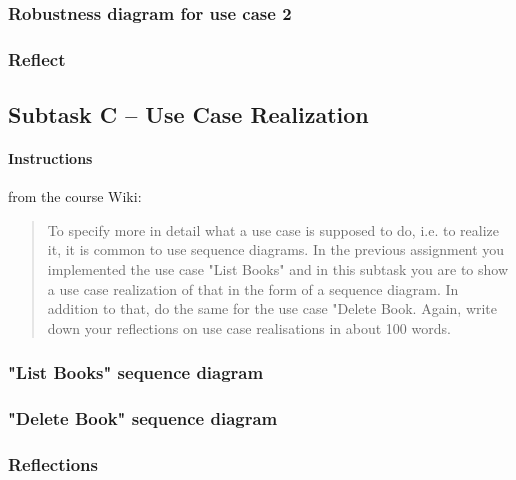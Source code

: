 \subsubsection{Robustness diagram for use case 2}\label{task-1b-robust2}
%


\subsubsection{Reflect}\label{task-1b-reflect}
%



\subsection{Subtask C -- Use Case Realization}\label{task-1c}
\paragraph{Instructions}\label{task-1c-instructions}
from the course Wiki\cite{1dv600:lab2:instructions}:

\begin{quote}
  To specify more in detail what a use case is supposed to do, i.e. to realize
  it, it is common to use sequence diagrams. In the previous assignment you
  implemented the use case "List Books" and in this subtask you are to show a
  use case realization of that in the form of a sequence diagram. In addition
  to that, do the same for the use case "Delete Book.  Again, write down your
  reflections on use case realisations in about 100 words.
\end{quote}


\subsubsection{"List Books" sequence diagram}\label{task-1c-sequence1}
%


\subsubsection{"Delete Book" sequence diagram}\label{task-1c-sequence2}
%


\subsubsection{Reflections}\label{task-1c-reflect}
%

